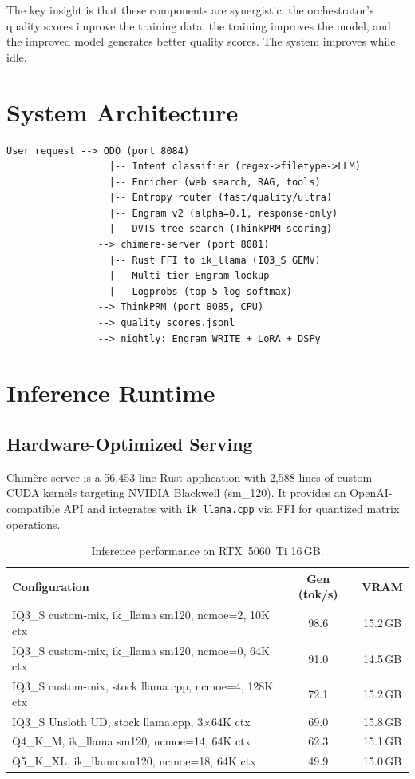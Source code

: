 \documentclass[10pt,a4paper]{article}
\begin{document}
The key insight is that these components are synergistic: the orchestrator's quality scores improve the training data, the training improves the model, and the improved model generates better quality scores. The system improves while idle.

\section{System Architecture}

\begin{verbatim}
User request --> ODO (port 8084)
                  |-- Intent classifier (regex->filetype->LLM)
                  |-- Enricher (web search, RAG, tools)
                  |-- Entropy router (fast/quality/ultra)
                  |-- Engram v2 (alpha=0.1, response-only)
                  |-- DVTS tree search (ThinkPRM scoring)
                --> chimere-server (port 8081)
                  |-- Rust FFI to ik_llama (IQ3_S GEMV)
                  |-- Multi-tier Engram lookup
                  |-- Logprobs (top-5 log-softmax)
                --> ThinkPRM (port 8085, CPU)
                --> quality_scores.jsonl
                --> nightly: Engram WRITE + LoRA + DSPy
\end{verbatim}

\section{Inference Runtime}

\subsection{Hardware-Optimized Serving}

Chim\`ere-server is a 56{,}453-line Rust application with 2{,}588 lines of custom CUDA kernels targeting NVIDIA Blackwell (sm\_120). It provides an OpenAI-compatible API and integrates with \texttt{ik\_llama.cpp} via FFI for quantized matrix operations.

\begin{table}[h]
\centering
\caption{Inference performance on RTX~5060~Ti 16\,GB.}
\begin{tabular}{lcc}
\toprule
\textbf{Configuration} & \textbf{Gen (tok/s)} & \textbf{VRAM} \\
\midrule
IQ3\_S custom-mix, ik\_llama sm120, ncmoe=2, 10K ctx & 98.6 & 15.2\,GB \\
IQ3\_S custom-mix, ik\_llama sm120, ncmoe=0, 64K ctx & 91.0 & 14.5\,GB \\
IQ3\_S custom-mix, stock llama.cpp, ncmoe=4, 128K ctx & 72.1 & 15.2\,GB \\
IQ3\_S Unsloth UD, stock llama.cpp, 3$\times$64K ctx & 69.0 & 15.8\,GB \\
Q4\_K\_M, ik\_llama sm120, ncmoe=14, 64K ctx & 62.3 & 15.1\,GB \\
Q5\_K\_XL, ik\_llama sm120, ncmoe=18, 64K ctx & 49.9 & 15.0\,GB \\
\bottomrule
\end{tabular}
\label{tab:perf}
\end{table}
\end{document}
